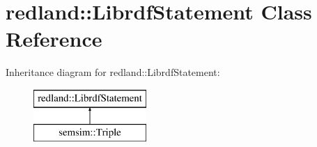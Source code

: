 \hypertarget{classredland_1_1LibrdfStatement}{}\section{redland\+:\+:Librdf\+Statement Class Reference}
\label{classredland_1_1LibrdfStatement}
Inheritance diagram for redland\+:\+:Librdf\+Statement\+:\begin{figure}[H]
\begin{center}
\leavevmode
\includegraphics[height=2.000000cm]{classredland_1_1LibrdfStatement}
\end{center}
\end{figure}
